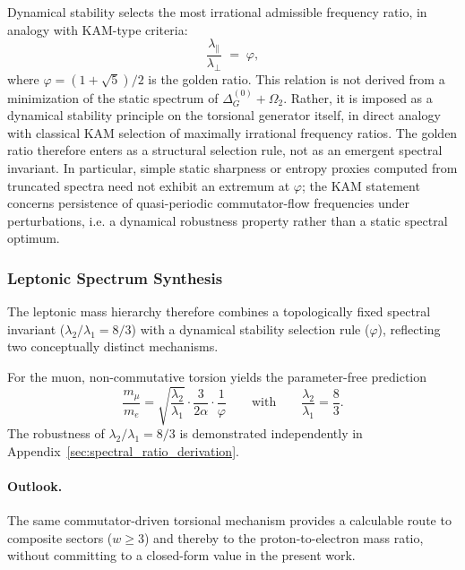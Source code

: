     Dynamical stability selects the most irrational admissible frequency ratio, in analogy with KAM-type criteria:
    \begin{equation}
      \frac{\lambda_{\parallel}}{\lambda_{\perp}}
      \;=\; \varphi,
      \label{eq:beta-golden}
    \end{equation}
    where $\varphi=(1+\sqrt5)/2$ is the golden ratio.
    This relation is not derived from a minimization of the static spectrum of $\Delta^{(0)}_G+\Omega_2$.
    Rather, it is imposed as a dynamical stability principle on the torsional
    generator itself, in direct analogy with classical KAM selection of maximally irrational frequency ratios.
    The golden ratio therefore enters as a structural selection rule, not as an emergent spectral invariant.
    In particular, simple static sharpness or entropy proxies computed from truncated spectra need not exhibit an extremum at
    $\varphi$; the KAM statement concerns persistence of quasi-periodic commutator-flow frequencies under perturbations, i.e. a
    dynamical robustness property rather than a static spectral optimum.

  \subsubsection*{Leptonic Spectrum Synthesis}
    \label{sec:leptonic-synthesis}

    The leptonic mass hierarchy therefore combines a topologically fixed spectral invariant ($\lambda_2/\lambda_1=8/3$)
    with a dynamical stability selection rule ($\varphi$), reflecting two conceptually distinct mechanisms.

    For the muon, non-commutative torsion yields the parameter-free prediction
    \begin{equation}
      \boxed{
        \frac{m_\mu}{m_e}
        = \sqrt{\frac{\lambda_{2}}{\lambda_{1}}}
        \cdot \frac{3}{2\alpha}
        \cdot \frac{1}{\varphi}
      }
      \qquad\text{with}\qquad
      \frac{\lambda_2}{\lambda_1}=\frac{8}{3}.
      \label{eq:muon-ratio-final}
    \end{equation}
    The robustness of $\lambda_2/\lambda_1=8/3$ is demonstrated independently in
    Appendix~\ref{sec:spectral_ratio_derivation}.

    \paragraph*{Outlook.}
      The same commutator-driven torsional mechanism provides a calculable route to composite sectors ($w\ge 3$) and thereby
      to the proton-to-electron mass ratio, without committing to a closed-form value in the present work.
